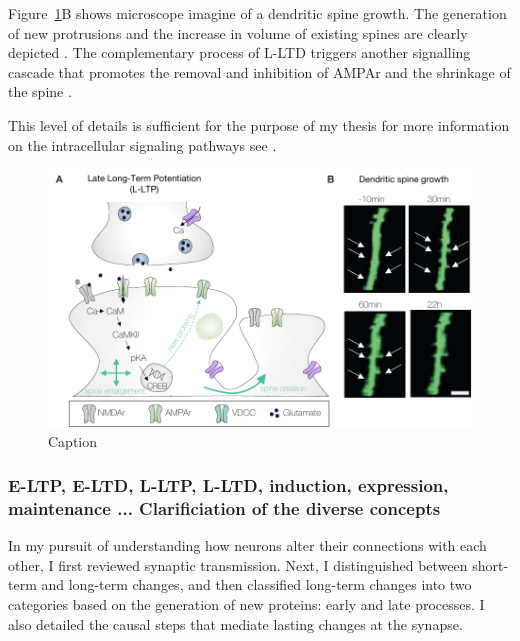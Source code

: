 Figure~\ref{fig:SP_L-LTP}B shows microscope imagine of a dendritic spine growth. The generation of new protrusions and the increase in volume of existing spines are clearly depicted \citep{lamprecht_structural_2004}.  The complementary process of \acrfull{L-LTD} triggers another signalling cascade that promotes the removal and inhibition of \acrshort{AMPAr} and the shrinkage of the spine \citep{bliss_long-term_2011}.

This level of details is sufficient for the purpose of my thesis for more information on the  intracellular signaling pathways see \citep{berridge_calcium_2014, citri_synaptic_2008, kotaleski_modelling_2010, bading_nuclear_2013, heidelberger_synaptic_2014,golbert_sleep_2017, seibt_primed_2019, feldman_spike_2020}.

\begin{figure}[h!]
    \centering
    \includegraphics{latex/fig/Intro/SP_L-LTP.pdf}
    \caption{Caption \citep{lamprecht_structural_2004}}
    \label{fig:SP_L-LTP}
\end{figure}




\subsubsection{E-LTP, E-LTD, L-LTP, L-LTD, induction, expression, maintenance ... Clarificiation of the diverse concepts }

In my pursuit of understanding how neurons alter their connections with each other, I first reviewed synaptic transmission. Next, I distinguished between short-term and long-term changes, and then classified long-term changes into two categories based on the generation of new proteins: early and late processes. I also detailed the causal steps that mediate lasting changes at the synapse.


